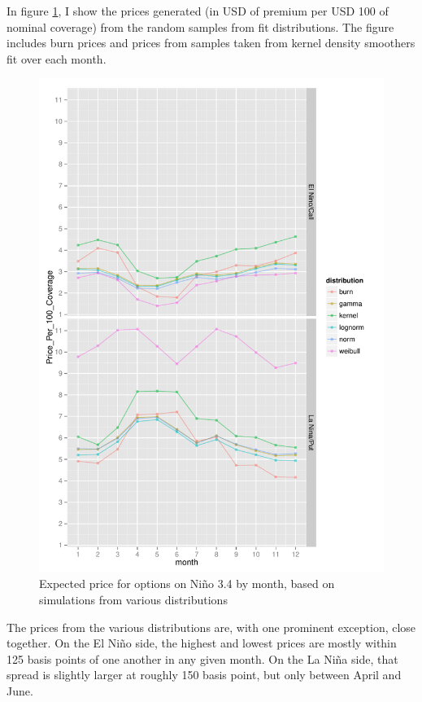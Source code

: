 \documentclass[authoryear]{article}
\begin{document}
In figure \ref{fig:optionPricesWithVariousDistMonth}, I show the prices generated (in USD of premium per USD 100 of nominal coverage) from the random samples from fit distributions. The figure includes burn prices and prices from samples taken from kernel density smoothers fit over each month. 

\begin{figure}[!htbp]
  \includegraphics[width=\linewidth]{Pricingfigs/optionPricesWithVariousDistMonth}
  \caption{Expected price for options on Ni\~no 3.4 by month, based on simulations from various distributions}
   \label{fig:optionPricesWithVariousDistMonth}
\end{figure}

The prices from the various distributions are, with one prominent exception, close together. On the El Ni\~no side, the highest and lowest prices are mostly within 125 basis points of one another in any given month. On the La Ni\~na side, that spread is slightly larger at roughly 150 basis point, but only between April and June.
\end{document}
